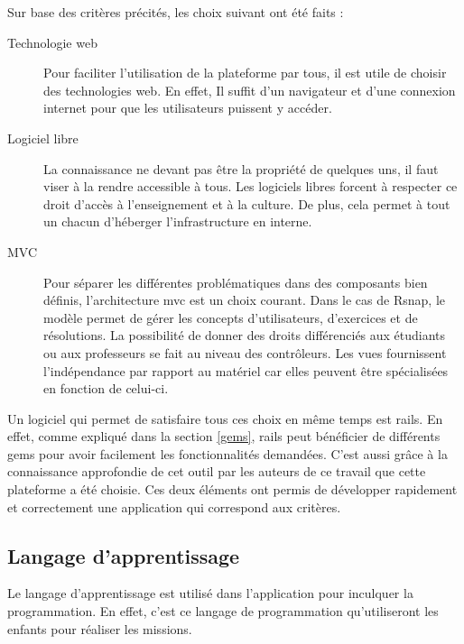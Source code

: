 Sur base des critères précités, les choix suivant ont été faits :
\begin{description}
  \item[Technologie web] Pour faciliter l'utilisation de la plateforme par tous, il est utile de choisir des technologies web. En effet, Il suffit d'un navigateur et d'une connexion internet pour que les utilisateurs puissent y accéder.
  \item[Logiciel libre] La connaissance ne devant pas être la propriété de quelques uns, il faut viser à la rendre accessible à tous. Les logiciels libres forcent à respecter ce droit d'accès à l'enseignement et à la culture. De plus, cela permet à tout un chacun d'héberger l'infrastructure en interne.
  \item[MVC] Pour séparer les différentes problématiques dans des composants bien définis, l'architecture \gls{mvc} est un choix courant. Dans le cas de \gls{Rsnap}, le modèle permet de gérer les concepts d'utilisateurs, d'exercices et de résolutions. La possibilité de donner des droits différenciés aux étudiants ou aux professeurs se fait au niveau des contrôleurs. Les vues fournissent l'indépendance par rapport au matériel car elles peuvent être spécialisées en fonction de celui-ci.
\end{description}
Un logiciel qui permet de satisfaire tous ces choix en même temps est \gls{rails}. En effet, comme expliqué dans la section \ref{gems}, \gls{rails} peut bénéficier de différents \glspl{gem}  pour avoir facilement les fonctionnalités demandées. C'est aussi grâce à la connaissance approfondie de cet outil par les auteurs de ce travail que cette plateforme a été choisie. Ces deux éléments ont permis de développer rapidement et correctement une application qui correspond aux critères.

\subsection{Langage d'apprentissage}
Le langage d'apprentissage est utilisé dans l'application pour inculquer la programmation. En effet, c'est ce langage de programmation qu'utiliseront les enfants pour réaliser les missions.

